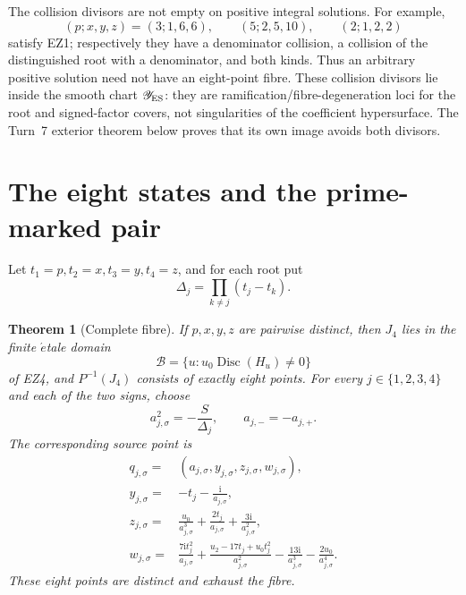 \documentclass[11pt]{article}
\newtheorem{theorem}{Theorem}[section]
\theoremstyle{definition}\newtheorem{definition}[theorem]{Definition}
\theoremstyle{remark}\newtheorem{remark}[theorem]{Remark}
\newcommand{\Disc}{\operatorname{Disc}}
\newcommand{\ii}{\mathrm i}
\begin{document}
The collision divisors are not empty on positive integral solutions.  For
example,
\[
 (p;x,y,z)=(3;1,6,6),\qquad(5;2,5,10),\qquad(2;1,2,2)
\]
satisfy EZ1; respectively they have a denominator collision, a collision of
the distinguished root with a denominator, and both kinds.  Thus an arbitrary
positive solution need not have an eight-point fibre.  These collision
divisors lie inside the smooth chart \(\mathscr Y_{\rm ES}\): they are
ramification/fibre-degeneration loci for the root and signed-factor covers,
not singularities of the coefficient hypersurface.  The Turn~7 exterior
theorem below proves that its own image avoids both divisors.

\section{The eight states and the prime-marked pair}

Let \(t_1=p,t_2=x,t_3=y,t_4=z\), and for each root put
\begin{equation}
 \Delta_j=\prod_{k\ne j}(t_j-t_k).
\end{equation}

\begin{theorem}[Complete fibre]
If \(p,x,y,z\) are pairwise distinct, then \(J_4\) lies in the finite
\(\acute{e}\)tale domain
\begin{equation}
 \mathcal B=\{u:u_0\Disc(H_u)\ne0\}                    \tag{EZ11}
\end{equation}
of EZ4, and \(P^{-1}(J_4)\) consists of exactly eight points.  For every
\(j\in\{1,2,3,4\}\) and each of the two signs, choose
\begin{equation}
 a_{j,\sigma}^2=-\frac{S}{\Delta_j},\qquad
 a_{j,-}=-a_{j,+}.                                     \tag{EZ12}
\end{equation}
The corresponding source point is
\begin{align}
 q_{j,\sigma}={}&(a_{j,\sigma},y_{j,\sigma},z_{j,\sigma},w_{j,\sigma}),
                                                               \nonumber\\
 y_{j,\sigma}={}&-t_j-\frac{\ii}{a_{j,\sigma}},\nonumber\\
 z_{j,\sigma}={}&\frac{u_0}{a_{j,\sigma}^3}
       +\frac{2t_j}{a_{j,\sigma}}+\frac{3\ii}{a_{j,\sigma}^2},\nonumber\\
 w_{j,\sigma}={}&\frac{7\ii t_j^2}{a_{j,\sigma}}
 +\frac{u_2-17t_j+u_0t_j^2}{a_{j,\sigma}^2}
 -\frac{13\ii}{a_{j,\sigma}^3}
 -\frac{2u_0}{a_{j,\sigma}^4}.                         \tag{EZ13}
\end{align}
These eight points are distinct and exhaust the fibre.
\end{theorem}
\end{document}
